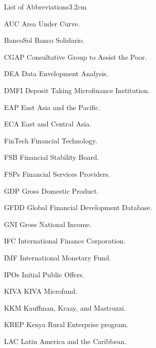 \begin{mclistof}{List of Abbreviations}{3.2cm}

\item[AUC] Area Under Curve.

\item[BancoSol] Banco Solidario.

\item[CGAP] Consultative Group to Assist the Poor.

\item[DEA] Data Envelopment Analysis.

\item[DMFI] Deposit Taking Microfinance Institution.

\item[EAP] East Asia and the Pacific.

\item[ECA] East and Central Asia.

\item[FinTech] Financial Technology.

\item[FSB] Financial Stability Board.

\item[FSPs] Financial Services Providers.

\item[GDP] Gross Domestic Product.

\item[GFDD] Global Financial Development Database.

\item[GNI] Gross National Income.

\item[IFC] International Finance Corporation.

\item[IMF] International Monetary Fund.

\item[IPOs] Initial Public Offers.

\item[KIVA] KIVA Microfund.

\item[KKM] Kauffman, Kraay, and Mastruzzi.

\item[KREP] Kenya Rural Enterprise program.

\item[LAC] Latin America and the Caribbean.


\end{mclistof}

